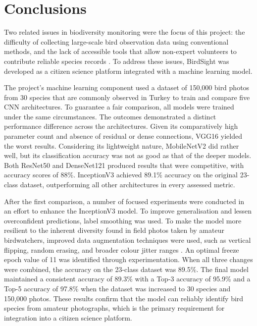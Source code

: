 \section{Conclusions}

Two related issues in biodiversity monitoring were the focus of this project:
the difficulty of collecting large-scale bird observation data using conventional
methods, and the lack of accessible tools that allow non-expert volunteers to
contribute reliable species records \cite{fraisl2022citizen,johnston2022outstanding}.
To address these issues, BirdSight was developed as a citizen science platform
integrated with a machine learning model.

The project's machine learning component used a dataset of 150,000 bird photos from 30 species
that are commonly observed in Turkey to train and compare five CNN architectures. To guarantee a fair 
comparison, all models were trained under the same circumstances. The outcomes demonstrated a 
distinct performance difference across the architectures. Given its comparatively high parameter 
count and absence of residual or dense connections, VGG16 yielded the worst results. Considering 
its lightweight nature, MobileNetV2 did rather well, but its classification accuracy was not as 
good as that of the deeper models. Both ResNet50 and DenseNet121 produced results that were 
competitive, with accuracy scores of 88\%. InceptionV3 achieved 89.1\% accuracy on the original 
23-class dataset, outperforming all other architectures in every assessed metric.

After the first comparison, a number of focused experiments were conducted in an effort to enhance 
the InceptionV3 model. To improve generalisation and lessen overconfident predictions, label 
smoothing was used. To make the model more resilient to the inherent diversity found in field photos
taken by amateur birdwatchers, improved data augmentation techniques were used, such as vertical 
flipping, random erasing, and broader colour jitter ranges \cite{johnston2022outstanding}. An optimal 
freeze epoch value of 11 was identified through experimentation. When all three changes were combined, the accuracy on 
the 23-class dataset was 89.5\%. The final model maintained a consistent accuracy of 89.3\% with a 
Top-3 accuracy of 95.9\% and a Top-5 accuracy of 97.8\% when the dataset was increased to 30 species 
and 150,000 photos. These results confirm that the model can reliably identify bird species from 
amateur photographs, which is the primary requirement for integration into a citizen science platform.

